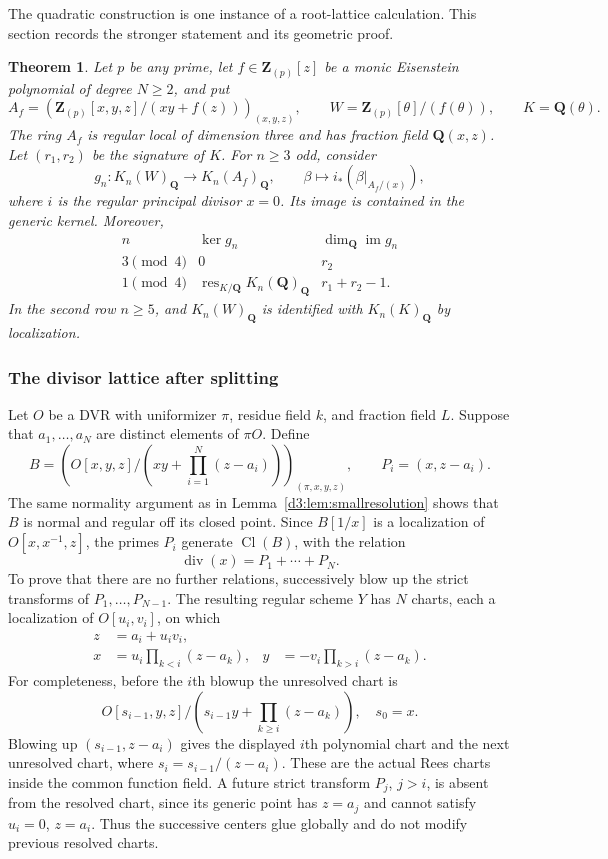 \documentclass[11pt,a4paper]{amsart}
\numberwithin{equation}{section}
\newtheorem{theorem}{Theorem}[section]
\theoremstyle{definition}
\theoremstyle{remark}
\newcommand{\Q}{\mathbf Q}
\newcommand{\Z}{\mathbf Z}
\newcommand{\Cl}{\operatorname{Cl}}
\newcommand{\divisor}{\operatorname{div}}
\begin{document}
The quadratic construction is one instance of a root-lattice calculation. This section records the stronger statement and its geometric proof.

\begin{theorem}\label{d3:thm:eisenstein}
Let $p$ be any prime, let $f\in\Z_{(p)}[z]$ be a monic Eisenstein polynomial of degree $N\geq2$, and put
\[
A_f=\left(\Z_{(p)}[x,y,z]/(xy+f(z))\right)_{(x,y,z)},\qquad
W=\Z_{(p)}[\theta]/(f(\theta)),\qquad K=\Q(\theta).
\]
The ring $A_f$ is regular local of dimension three and has fraction field $\Q(x,z)$. Let $(r_1,r_2)$ be the signature of $K$. For $n\geq3$ odd, consider
\[
g_n:K_n(W)_{\Q}\longrightarrow K_n(A_f)_{\Q},\qquad
\beta\longmapsto i_*(\beta|_{A_f/(x)}),
\]
where $i$ is the regular principal divisor $x=0$. Its image is contained in the generic kernel. Moreover,
\[
\begin{array}{c|c|c}
n&\ker g_n&\dim_{\Q}\operatorname{im}g_n\\ \hline
3\pmod4&0&r_2\\
1\pmod4&\operatorname{res}_{K/\Q}K_n(\Q)_{\Q}&r_1+r_2-1.
\end{array}
\]
In the second row $n\geq5$, and $K_n(W)_{\Q}$ is identified with $K_n(K)_{\Q}$ by localization.
\end{theorem}

\subsubsection{The divisor lattice after splitting}

Let $O$ be a DVR with uniformizer $\pi$, residue field $k$, and fraction field $L$. Suppose that $a_1,\ldots,a_N$ are distinct elements of $\pi O$. Define
\[
B=\left(O[x,y,z]/\left(xy+\prod_{i=1}^N(z-a_i)\right)\right)_{(\pi,x,y,z)},
\qquad P_i=(x,z-a_i).
\]
The same normality argument as in Lemma~\ref{d3:lem:smallresolution} shows that $B$ is normal and regular off its closed point. Since $B[1/x]$ is a localization of $O[x,x^{-1},z]$, the primes $P_i$ generate $\Cl(B)$, with the relation
\[
\divisor(x)=P_1+\cdots+P_N.
\]
To prove that there are no further relations, successively blow up the strict transforms of $P_1,\ldots,P_{N-1}$. The resulting regular scheme $Y$ has $N$ charts, each a localization of $O[u_i,v_i]$, on which
\begin{align*}
z&=a_i+u_i v_i,\\
x&=u_i\prod_{k<i}(z-a_k),&
y&=-v_i\prod_{k>i}(z-a_k).
\end{align*}
For completeness, before the $i$th blowup the unresolved chart is
\[
O[s_{i-1},y,z]/\left(s_{i-1}y+\prod_{k\geq i}(z-a_k)\right),
\quad s_0=x.
\]
Blowing up $(s_{i-1},z-a_i)$ gives the displayed $i$th polynomial chart and the next unresolved chart, where $s_i=s_{i-1}/(z-a_i)$. These are the actual Rees charts inside the common function field. A future strict transform $P_j$, $j>i$, is absent from the resolved chart, since its generic point has $z=a_j$ and cannot satisfy $u_i=0$, $z=a_i$. Thus the successive centers glue globally and do not modify previous resolved charts.
\end{document}
